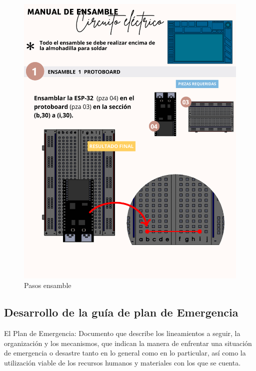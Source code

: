     \begin{figure}[H]
        \centering
        \includegraphics[trim = {1mm 1mm 1mm 1mm},clip,scale=0.2]{34/img/pasosEnsamble.png}
        \caption{Pasos ensamble}
        \label{fig:enter-label3}
    \end{figure}
    \subsection{Desarrollo de la guía de plan de Emergencia}
    
    El Plan de Emergencia: Documento que describe los lineamientos a seguir, la organización y los mecanismos, que indican la manera de enfrentar una situación de emergencia o desastre tanto en lo general como en lo particular, así como la utilización viable de los recursos humanos y materiales con los que se cuenta.
